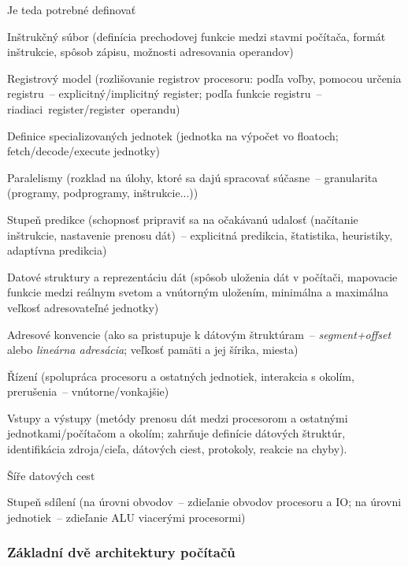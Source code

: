 \begin{obecne}{Je teda potrebné definovať}
\begin{pitemize}
	\item Inštrukčný súbor (definícia prechodovej funkcie medzi stavmi počítača, formát inštrukcie, spôsob zápisu, možnosti adresovania operandov)
	\item Registrový model (rozlišovanie registrov procesoru: podľa voľby, pomocou určenia registru~-- explicitný/implicitný register; podľa funkcie registru~-- riadiaci~register/register~operandu)
	\item Definice specializovaných jednotek (jednotka na výpočet vo floatoch;\\fetch/decode/execute jednotky)
	\item Paralelismy (rozklad na úlohy, ktoré sa dajú spracovať súčasne~-- granularita (programy, podprogramy, inštrukcie...))
	\item Stupeň predikce (schopnosť pripraviť sa na očakávanú udalosť (načítanie inštrukcie, nastavenie prenosu dát)~-- explicitná predikcia, štatistika, heuristiky, adaptívna predikcia)

\bigskip
	\item Datové struktury a reprezentáciu dát (spôsob uloženia dát v počítači, mapovacie funkcie medzi reálnym svetom a vnútorným uložením, minimálna a maximálna veľkosť adresovateľné jednotky)
	\item Adresové konvencie (ako sa pristupuje k dátovým štruktúram~-- \emph{segment+offset} alebo \emph{lineárna adresácia}; veľkosť pamäti a jej šírika,  miesta)

\bigskip
	\item Řízení (spolupráca procesoru a ostatných jednotiek, interakcia s okolím, prerušenia~-- vnútorne/vonkajšie)
	\item Vstupy a výstupy (metódy prenosu dát medzi procesorom a ostatnými jednotkami/počítačom a okolím; zahrňuje definície dátových štruktúr, identifikácia zdroja/cieľa, dátových ciest, protokoly, reakcie na chyby).
	\item Šíře datových cest
	\item Stupeň sdílení (na úrovni obvodov~-- zdieľanie obvodov procesoru a IO; na úrovni jednotiek~-- zdieľanie ALU viacerými procesormi)
\end{pitemize}
\end{obecne}

\subsubsection*{Základní dvě architektury počítačů}


